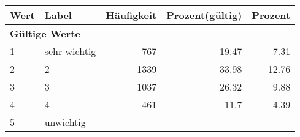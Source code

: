      \begin{longtable}{lXrrr}
     \toprule
     \textbf{Wert} & \textbf{Label} & \textbf{Häufigkeit} & \textbf{Prozent(gültig)} & \textbf{Prozent} \\
     \endhead
     \midrule
     \multicolumn{5}{l}{\textbf{Gültige Werte}}\\

     1 &
     \multicolumn{1}{X}{ sehr wichtig   } &


       \num{767} &
       \num[round-mode=places,round-precision=2]{19,47} &
         \num[round-mode=places,round-precision=2]{7,31} \\

     2 &
     \multicolumn{1}{X}{ 2   } &


       \num{1339} &
       \num[round-mode=places,round-precision=2]{33,98} &
         \num[round-mode=places,round-precision=2]{12,76} \\

     3 &
     \multicolumn{1}{X}{ 3   } &


       \num{1037} &
       \num[round-mode=places,round-precision=2]{26,32} &
         \num[round-mode=places,round-precision=2]{9,88} \\

     4 &
     \multicolumn{1}{X}{ 4   } &


       \num{461} &
       \num[round-mode=places,round-precision=2]{11,7} &
         \num[round-mode=places,round-precision=2]{4,39} \\

     5 &
     \multicolumn{1}{X}{ unwichtig   } &



\end{longtable}
